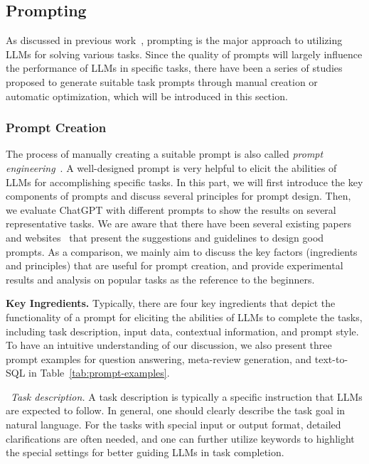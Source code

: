 {{{\subsection{Prompting}
As discussed in previous work~\cite{Liu-survey-2023-Pre-train}, prompting is the major approach to utilizing LLMs for solving various tasks. Since the quality of prompts will largely influence the  performance of LLMs in specific tasks, there have been a series of studies proposed to generate suitable task prompts through manual creation or automatic optimization, which will be introduced in this section.

\subsubsection{Prompt Creation}\label{subsec:promptdesign}
The process of manually creating a suitable prompt is also called \emph{prompt engineering}~\cite{Liu-arxiv-2022-Design,White-arxiv-2023-Prompt}. A well-designed prompt is very helpful to elicit the abilities of LLMs for accomplishing specific tasks. In this part, we will first introduce the key components of prompts and discuss several principles for prompt design. Then, we evaluate ChatGPT with different prompts to show the results on several representative tasks. We are aware that there have been several existing papers~\cite{Santu-arxiv-2023-TELeR,White-arxiv-2023-Prompt} and websites~\cite{OpenAI-OpenAI-2023-PromptGuide,Contributors-AIShort-2023-AIShort,Contributors-Github-2023-Awesome} that present the suggestions and guidelines to design good prompts. As a comparison, we mainly aim to discuss the key factors (ingredients and principles) that are useful for prompt creation, and provide experimental results and analysis on popular tasks as the reference to the beginners. 

\textbf{Key Ingredients.} Typically, there are four key ingredients that {depict the functionality of a  prompt for eliciting the abilities of LLMs to complete the tasks}, including task description, input data, contextual information, and prompt  style. To have an intuitive understanding of our discussion, we also present three prompt examples for question answering, meta-review generation, and text-to-SQL    in Table~\ref{tab:prompt-examples}.

\textbullet~\emph{Task description.} A task description is typically a specific instruction that LLMs are expected to follow. In general, one  should clearly describe the task goal  in natural language. For the tasks with special input or output format, detailed clarifications are often needed, and one can further utilize keywords to highlight the special settings for better guiding LLMs in task completion. 

}}}
